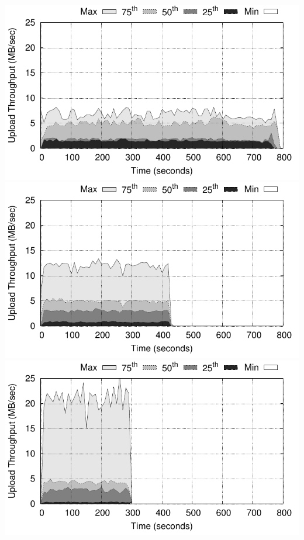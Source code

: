 \begin{minipage}{\linewidth}
\begin{minipage}{0.3\linewidth}
  \end{minipage}
  \hspace{0.03\linewidth}
  \begin{minipage}{0.3\linewidth}
    \captionsetup{font=scriptsize}
    \includegraphics[width=\linewidth]{Figures/plots/secure_streams/throughput/tput_tx_percentiles_1-workers-encrypted-nosgx}
    \includegraphics[width=\linewidth]{Figures/plots/secure_streams/throughput/tput_tx_percentiles_2-workers-encrypted-nosgx}
    \includegraphics[width=\linewidth]{Figures/plots/secure_streams/throughput/tput_tx_percentiles_4-workers-encrypted-nosgx}

\end{minipage}
\end{minipage}
